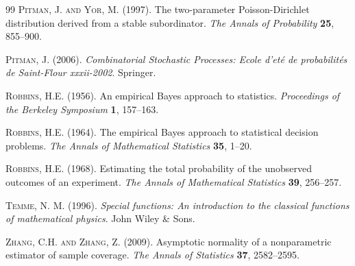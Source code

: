 \documentclass{article}
\newcommand{\1}{\boldsymbol{1}}
\theoremstyle{plain}
\begin{document}
\begin{thebibliography}{99}
\textsc{Pitman, J. and Yor, M.} (1997). The two-parameter Poisson-Dirichlet distribution derived from a stable subordinator. \textit{The Annals of Probability} \textbf{25}, 855--900.

\textsc{Pitman, J.} (2006). \textit{Combinatorial Stochastic Processes: Ecole d'eté de probabilités de Saint-Flour xxxii-2002}. Springer.

\textsc{Robbins, H.E.} (1956). An empirical Bayes approach to statistics. \textit{Proceedings of the Berkeley Symposium} \textbf{1}, 157--163.

\textsc{Robbins, H.E.} (1964). The empirical Bayes approach to statistical decision problems. \textit{The Annals of Mathematical Statistics} \textbf{35}, 1--20.

\textsc{Robbins, H.E.} (1968). Estimating the total probability of the unobserved outcomes of an experiment. \textit{The Annals of Mathematical Statistics} \textbf{39}, 256--257.

\textsc{Temme, N. M.} (1996). \textit{Special functions: An introduction to the classical functions of mathematical physics}. John Wiley \& Sons.

\textsc{Zhang, C.H. and Zhang, Z.} (2009). Asymptotic normality of a nonparametric estimator of sample coverage. \textit{The Annals of Statistics} \textbf{37}, 2582--2595.

\end{thebibliography}
\end{document}
